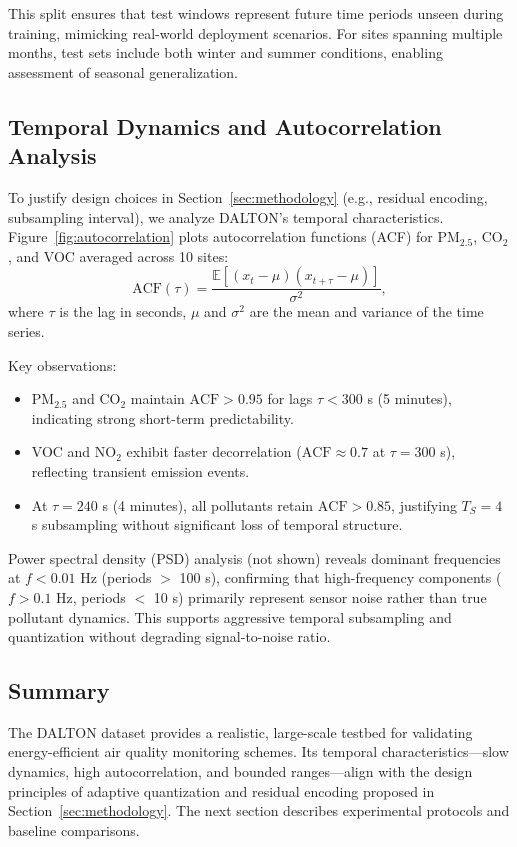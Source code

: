This split ensures that test windows represent future time periods unseen during training, mimicking real-world deployment scenarios. For sites spanning multiple months, test sets include both winter and summer conditions, enabling assessment of seasonal generalization.

\subsection{Temporal Dynamics and Autocorrelation Analysis}

To justify design choices in Section~\ref{sec:methodology} (e.g., residual encoding, subsampling interval), we analyze DALTON's temporal characteristics. Figure~\ref{fig:autocorrelation} plots autocorrelation functions (ACF) for PM$_{2.5}$, CO$_2$, and VOC averaged across 10 sites:
\begin{equation}
\text{ACF}(\tau) = \frac{\mathbb{E}[(x_t - \mu)(x_{t+\tau} - \mu)]}{\sigma^2},
\label{eq:acf}
\end{equation}
where $\tau$ is the lag in seconds, $\mu$ and $\sigma^2$ are the mean and variance of the time series.

Key observations:
\begin{itemize}
\item PM$_{2.5}$ and CO$_2$ maintain $\text{ACF} > 0.95$ for lags $\tau < 300$ s (5 minutes), indicating strong short-term predictability.
\item VOC and NO$_2$ exhibit faster decorrelation ($\text{ACF} \approx 0.7$ at $\tau = 300$ s), reflecting transient emission events.
\item At $\tau = 240$ s (4 minutes), all pollutants retain $\text{ACF} > 0.85$, justifying $T_S = 4$ s subsampling without significant loss of temporal structure.
\end{itemize}

Power spectral density (PSD) analysis (not shown) reveals dominant frequencies at $f < 0.01$ Hz (periods $>$ 100 s), confirming that high-frequency components ($f > 0.1$ Hz, periods $<$ 10 s) primarily represent sensor noise rather than true pollutant dynamics. This supports aggressive temporal subsampling and quantization without degrading signal-to-noise ratio.

\subsection{Summary}

The DALTON dataset provides a realistic, large-scale testbed for validating energy-efficient air quality monitoring schemes. Its temporal characteristics—slow dynamics, high autocorrelation, and bounded ranges—align with the design principles of adaptive quantization and residual encoding proposed in Section~\ref{sec:methodology}. The next section describes experimental protocols and baseline comparisons.